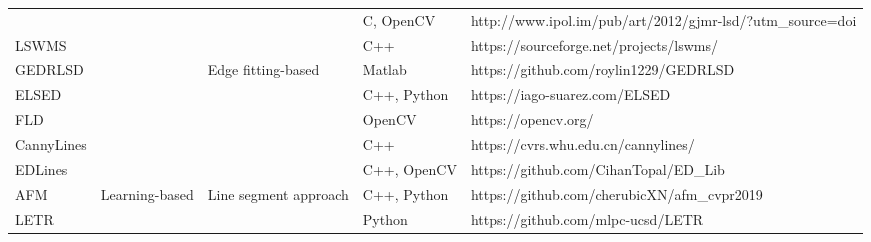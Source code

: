 \documentclass[journal,compsoc]{IEEEtran}
\begin{document}
\begin{table*}[tbp]
\begin{tabular}{|p{}<{\centering}|p{}<{\centering}|p{}<{\centering}|p{}<{\centering}|p{}<{\centering}|}
                              & \multicolumn{1}{c|}{}                                 &                                          & C, OpenCV      & http://www.ipol.im/pub/art/2012/gjmr-lsd/?utm\_source=doi              \\ \cline{1-1} \cline{4-5}  		LSWMS \cite{Linesegmentdetectionusingweightedmeanshiftproceduresona2Dslicesamplingstrategy} & \multicolumn{1}{c|}{}                                 &                                          & C++            & https://sourceforge.net/projects/lswms/                                \\ \cline{1-1} \cline{3-5}  		GEDRLSD \cite{E2LSD}                                                                        & \multicolumn{1}{c|}{}                                 & \multirow{5}{*}{Edge fitting-based}              & Matlab         & https://github.com/roylin1229/GEDRLSD                                  \\ \cline{1-1} \cline{4-5}  		ELSED \cite{ELSED}                                                                          & \multicolumn{1}{c|}{}                                 &                                          & C++, Python    & https://iago-suarez.com/ELSED                                          \\ \cline{1-1} \cline{4-5}  		FLD \cite{Outdoorplacerecognitioninurbanenvironmentsusingstraightlines}                     & \multicolumn{1}{c|}{}                                 &                                          & OpenCV         & https://opencv.org/                                                    \\ \cline{1-1} \cline{4-5}  		CannyLines \cite{CannyLines}                                                                & \multicolumn{1}{c|}{}                                 &                                          & C++            & https://cvrs.whu.edu.cn/cannylines/                                    \\ \cline{1-1} \cline{4-5}  		EDLines \cite{EDLines}                                                                      & \multicolumn{1}{c|}{}                                 &                                          & C++, OpenCV    & https://github.com/CihanTopal/ED\_Lib                                  \\ \hline 		AFM \cite{LearningAttractionFieldRepresentationforRobustLineSegmentDetection}               & \multicolumn{1}{c|}{\multirow{12}{*}{Learning-based}} & \multirow{6}{*}{Line segment approach}            & C++, Python    & https://github.com/cherubicXN/afm\_cvpr2019                            \\ \cline{1-1} \cline{4-5}  		LETR \cite{LineSegmentDetectionUsingTransformerswithoutEdges}                               & \multicolumn{1}{c|}{}                                 &                                          & Python         & https://github.com/mlpc-ucsd/LETR                                      \\ \cline{1-1} \cline{4-5}  
\end{tabular}
\end{table*}
\end{document}
